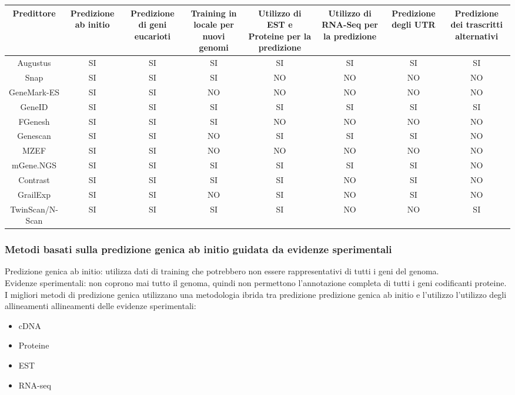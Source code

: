 \documentclass{article}
\begin{document}
\begin{center}
    \begin{tabular}{*{8}c}
        \toprule
        \multicolumn{1}{p{1.5cm}}{\centering Predittore}
        & \multicolumn{1}{p{1.5cm}}{\centering Predizione ab initio}
        & \multicolumn{1}{p{1.5cm}}{\centering Predizione di geni eucarioti} & 
        \multicolumn{1}{p{1.5cm}}{\centering Training in locale per nuovi genomi} & 
        \multicolumn{1}{p{1.5cm}}{\centering Utilizzo di EST e Proteine per la predizione} &
        \multicolumn{1}{p{1.5cm}}{\centering Utilizzo di RNA-Seq per la predizione} 
        & \multicolumn{1}{p{1.5cm}}{\centering Predizione degli UTR}
        & \multicolumn{1}{p{1.5cm}}{\centering Predizione dei trascritti alternativi} \\
        \midrule
        Augustus & SI & SI & SI & SI & SI & SI & SI \\
        Snap & SI & SI & SI & NO & NO & NO & NO\\
        GeneMark-ES & SI & SI & NO & NO & NO & NO & NO\\
        GeneID & SI & SI & SI & SI & SI & SI & SI \\
        FGenesh & SI & SI & SI & NO & NO & NO & NO \\
        Genescan & SI & SI & NO & SI & SI & SI & NO \\
        MZEF & SI & SI & NO & NO & NO & NO & NO \\
        mGene.NGS & SI & SI & SI & SI & SI & SI & NO \\
        Contrast & SI & SI & SI & SI & NO & SI & NO \\
        GrailExp & SI & SI & NO & SI & NO & SI & NO \\
        TwinScan/N-Scan & SI & SI & SI & SI & NO & NO & SI
    \end{tabular}
\end{center}

\subsubsection{Metodi basati sulla predizione genica ab initio guidata da evidenze sperimentali}
Predizione genica ab initio: utilizza dati di training che potrebbero non
essere rappresentativi di tutti i geni del genoma.\\
Evidenze sperimentali: non coprono mai tutto il genoma, quindi non
permettono l’annotazione completa di tutti i geni codificanti proteine.\\
I migliori metodi di predizione genica utilizzano una metodologia
ibrida tra predizione predizione genica ab initio e l’utilizzo l’utilizzo degli allineamenti allineamenti delle
evidenze sperimentali:
\begin{itemize}
    \item cDNA
    \item Proteine
    \item EST
    \item RNA-seq
\end{itemize}
\end{document}
